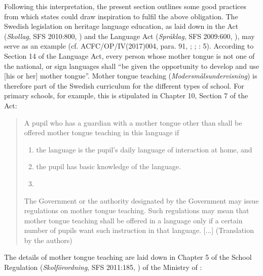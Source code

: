 \documentclass[output=paper,colorlinks,citecolor=brown]{langscibook}
\begin{document}
Following this interpretation, the present section outlines some good practices from which states could draw inspiration to fulfil the above obligation. The Swedish legislation on heritage language education, as laid down in the  Act (\textit{Skollag}, SFS 2010:800, \citealt{skollag2010}) and the Language Act (\textit{Språklag}, SFS 2009:600, \citealt{spraklag2009}), may serve as an example (cf. ACFC/OP/IV(2017)004, para. 91, \citealt{acfc2017}; \citealt{salo2018}; \citealt{hofmann_malkmus2022a}: 5). According to Section 14 of the Language Act, every person whose mother tongue is not one of the national,  or sign languages shall ``be given the opportunity to develop and use [his or her] mother tongue''. Mother tongue teaching (\textit{Modersmålsundervisning}) is therefore part of the Swedish curriculum for the different types of school. For primary schools, for example, this is stipulated in Chapter 10, Section 7 of the  Act:

\begin{quote}
    A pupil who has a guardian with a mother tongue other than  shall be offered mother tongue teaching in this language if
    \begin{enumerate}
        \item the language is the pupil's daily language of interaction at home, and
        \item the pupil has basic knowledge of the language.
        \item[] [...]
    \end{enumerate}
    The Government or the authority designated by the Government may issue regulations on mother tongue teaching. Such regulations may mean that mother tongue teaching shall be offered in a language only if a certain number of pupils want such instruction in that language. [...] (Translation by the authors)
\end{quote}

The details of mother tongue teaching are laid down in Chapter 5 of the School Regulation (\textit{Skolförordning}, SFS 2011:185, \citealt{skolforordning2011}) of the Ministry of : 
\end{document}

